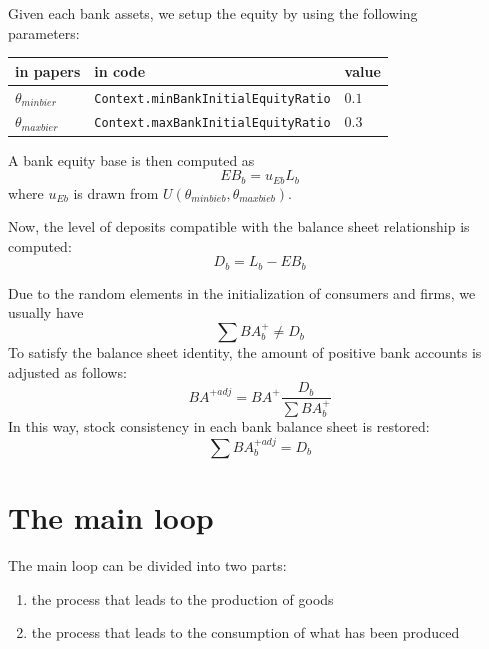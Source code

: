 \documentclass{book}
\begin{document}
Given each bank assets, we setup the equity by using the following\\
parameters:\\
\begin{tabular}{l l l}
	\hline
	in papers& in code&value\\
	\hline
	\hline
 $\theta_{minbier}$&\verb+Context.minBankInitialEquityRatio+&$0.1$\\
 $\theta_{maxbier}$&\verb+Context.maxBankInitialEquityRatio+&$0.3$\\
	\hline
\end{tabular}

\vskip5mm
A bank equity base is then computed as
\[
	EB_b=u_{Eb}L_b
\]
where $u_{Eb}$ is drawn from $U(\theta_{minbieb},\theta_{maxbieb})$.

Now, the level of deposits compatible with the balance sheet relationship is computed:
\[
D_b=L_b-EB_b
\]

Due to the random elements in the initialization of consumers and firms, we usually have
\[
	\sum BA^+_b \neq D_b
\]
To satisfy the balance sheet identity, the amount of positive bank accounts is adjusted as follows:
\[
	BA^{+adj}=BA^+\frac{D_b}{\sum BA^+_b}
\]
In this way, stock consistency in each bank balance sheet is restored:
\[
	\sum BA^{+adj}_b=D_b
\]

\newpage
\section{The main loop}
The main loop can be divided into two parts:
\begin{enumerate}
	\item the process that leads to the production of goods
	\item the process that leads to the consumption of what has been produced
\end{enumerate}
\end{document}
